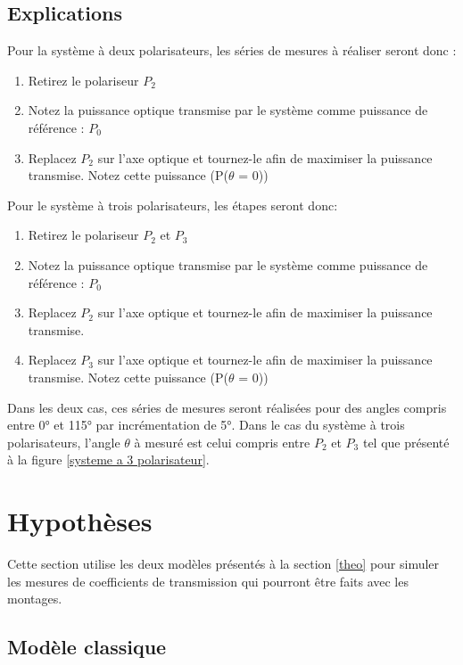 \documentclass[11pt,letterpaper]{article}
\begin{document}
\subsection{Explications}

Pour la système à deux polarisateurs, les séries de mesures à réaliser seront donc :

\begin{enumerate}
    \item Retirez le polariseur $P_2$
    \item Notez la puissance optique transmise par le système comme puissance de référence : $P_0$
    \item Replacez $P_2$ sur l’axe optique et tournez-le afin de maximiser la puissance transmise. Notez cette puissance (P($\theta$ = 0))
\end{enumerate}

Pour le système à trois polarisateurs, les étapes seront donc: 

\begin{enumerate}
    \item Retirez le polariseur $P_2$ et $P_3$
    \item Notez la puissance optique transmise par le système comme puissance de référence : $P_0$
    \item Replacez $P_2$ sur l’axe optique et tournez-le afin de maximiser la puissance transmise.
    \item Replacez $P_3$ sur l’axe optique et tournez-le afin de maximiser la puissance transmise. Notez cette puissance (P($\theta$ = 0))
\end{enumerate}

Dans les deux cas, ces séries de mesures seront réalisées pour des angles compris entre 0° et 115° par incrémentation de 5°. Dans le cas du système à trois polarisateurs, l'angle $\theta$ à mesuré est celui compris entre $P_2$ et $P_3$ tel que présenté à la figure \ref{systeme a 3 polarisateur}.



\section{Hypothèses}

Cette section utilise les deux modèles présentés à la section \ref{theo} pour simuler les mesures de
coefficients de transmission qui pourront être faits avec les montages.

\subsection{Modèle classique}
\end{document}
